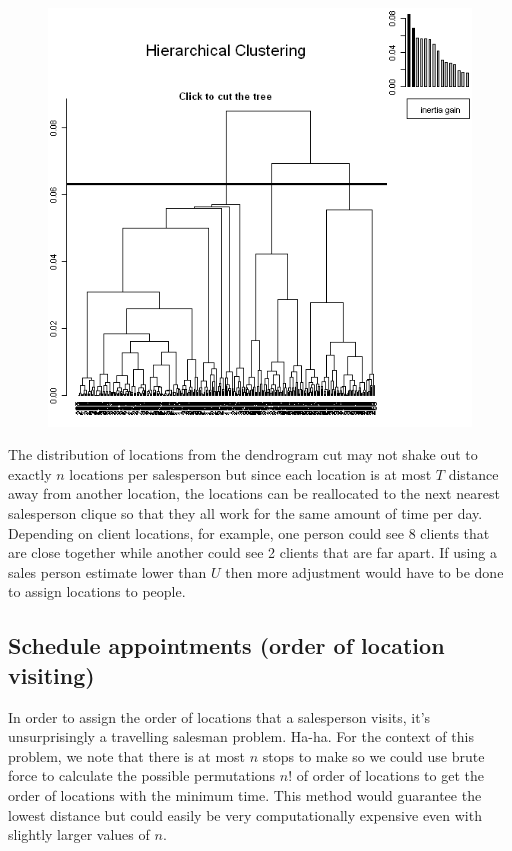 \documentclass{article}
\begin{document}
\begin{figure}[H]
	\centering
	\includegraphics[scale=0.50]{hierarchical_clustering_example}
	\label{fig:Hierarchical Clustering Dendrogram Example}
\end{figure}

The distribution of locations from the dendrogram cut may not shake out to exactly $n$ locations per salesperson but since each location is at most $T$ distance away from another location, the locations can be reallocated to the next nearest salesperson clique so that they all work for the same amount of time per day.  Depending on client locations, for example, one person could see 8 clients that are close together while another could see 2 clients that are far apart.  If using a sales person estimate lower than $U$ then more adjustment would have to be done to assign locations to people.\\

\subsection{Schedule appointments (order of location visiting)}
In order to assign the order of locations that a salesperson visits, it's unsurprisingly a travelling salesman problem. Ha-ha. For the context of this problem, we note that there is at most $n$ stops to make so we could use brute force to calculate the possible permutations $n!$ of order of locations to get the order of locations with the minimum time. This method would guarantee the lowest distance but could easily be very computationally expensive even with slightly larger values of $n$.\\
\end{document}
